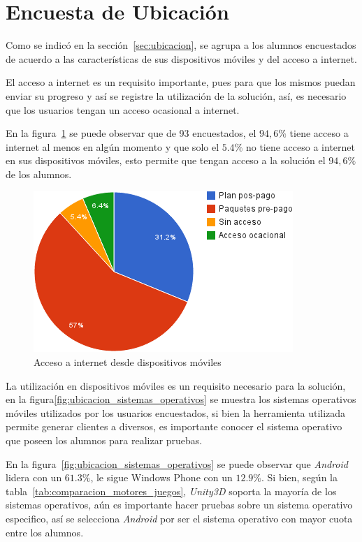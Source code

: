 \section{Encuesta de Ubicación}
\label{sec:res_ubicacion}

Como se indicó en la sección~\ref{sec:ubicacion}, se agrupa a los alumnos
encuestados de acuerdo a las características de sus dispositivos móviles y del
acceso a internet.

El acceso a internet es un requisito importante, pues para que los mismos puedan
enviar su progreso y así se registre la utilización de la solución, así, es
necesario que los usuarios tengan un acceso ocasional a internet. 

En la figura~\ref{fig:ubicacion_acceso_internet} se puede observar que de 93
encuestados, el $94,6\%$ tiene acceso a internet al menos en algún momento y que
solo el $5.4\%$ no tiene acceso a internet en sus dispositivos móviles, esto
permite que tengan acceso a la solución el $94,6\%$ de los alumnos.

\begin{figure}[H]
\centering
\includegraphics[scale=0.5]{resultados/imagenes/ubicacion_acceso_internet.png}
\caption{Acceso a internet desde dispositivos móviles}
\label{fig:ubicacion_acceso_internet}
\end{figure}

La utilización en dispositivos móviles es un requisito necesario para la
solución, en la figura\ref{fig:ubicacion_sistemas_operativos} se muestra
los sistemas operativos móviles utilizados por los usuarios encuestados, si bien
la herramienta utilizada permite generar clientes a diversos, es importante
conocer el sistema operativo que poseen los alumnos para realizar pruebas.

En la figura~\ref{fig:ubicacion_sistemas_operativos} se puede observar que
\emph{Android} lidera con un $61.3\%$, le sigue Windows Phone con un $12.9\%$.
Si bien, según la tabla~\ref{tab:comparacion_motores_juegos}, \emph{Unity3D}
soporta la mayoría de los sistemas operativos, aún es importante hacer pruebas
sobre un sistema operativo especifico, así se selecciona \emph{Android} por ser
el sistema operativo con mayor cuota entre los alumnos.

